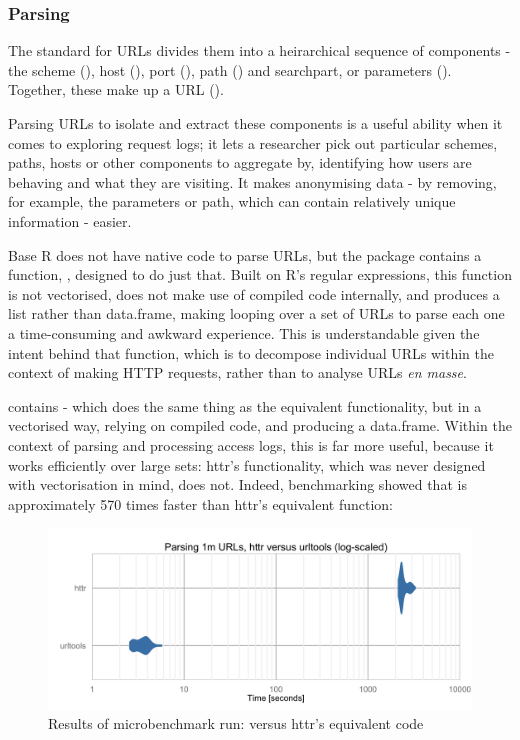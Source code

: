 \subsubsection{Parsing}\label{parsing}

The standard for URLs \citep{RFC1738} divides them into a heirarchical
sequence of components - the scheme (), host
(), port (), path
() and searchpart, or parameters
(). Together, these make up a URL
\linebreak ().

Parsing URLs to isolate and extract these components is a useful ability
when it comes to exploring request logs; it lets a researcher pick out
particular schemes, paths, hosts or other components to aggregate by,
identifying how users are behaving and what they are visiting. It makes
anonymising data - by removing, for example, the parameters or path,
which can contain relatively unique information - easier.

Base R does not have native code to parse URLs, but the 
package \citep{httr} contains a function, , designed to
do just that. Built on R's regular expressions, this function is not
vectorised, does not make use of compiled code internally, and produces
a list rather than data.frame, making looping over a set of URLs to
parse each one a time-consuming and awkward experience. This is
understandable given the intent behind that function, which is to
decompose individual URLs within the context of making HTTP requests,
rather than to analyse URLs \emph{en masse}.

 contains  - which does the same thing as
the equivalent  functionality, but in a vectorised way,
relying on compiled code, and producing a data.frame. Within the context
of parsing and processing access logs, this is far more useful, because
it works efficiently over large sets: httr's functionality, which was
never designed with vectorisation in mind, does not. Indeed,
benchmarking showed that  is approximately 570 times
faster than httr's equivalent function:

\begin{figure}[h]
    \centering
    \includegraphics[width=14cm,keepaspectratio]{parsing_benchmarks-jay}
    \caption{Results of microbenchmark run:  versus httr's equivalent code}
\end{figure}

